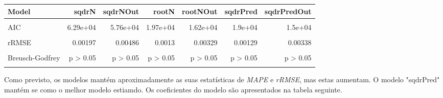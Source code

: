 \documentclass[justified, 11pt]{scrartcl}\usepackage[]{graphicx}\usepackage[]{xcolor}
\newenvironment{knitrout}{}{} %
\begin{document}
\begin{knitrout}
\begin{table}
\begin{tabular}{l|r|r|r|r|r|r}
\hline
Model & sqdrN & sqdrNOut & rootN & rootNOut & sqdrPred & sqdrPredOut\\
\hline
\cellcolor{gray!6}{R2} & \cellcolor{gray!6}{0.887} & \cellcolor{gray!6}{0.74} & \cellcolor{gray!6}{0.369} & \cellcolor{gray!6}{0.383} & \cellcolor{gray!6}{0.443} & \cellcolor{gray!6}{0.496}\\
\hline
AIC & 6.29e+04 & 5.76e+04 & 1.97e+04 & 1.62e+04 & 1.9e+04 & 1.5e+04\\
\hline
\cellcolor{gray!6}{MAPE} & \cellcolor{gray!6}{0.153} & \cellcolor{gray!6}{0.132} & \cellcolor{gray!6}{0.0859} & \cellcolor{gray!6}{0.0832} & \cellcolor{gray!6}{0.084} & \cellcolor{gray!6}{0.0863}\\
\hline
rRMSE & 0.00197 & 0.00486 & 0.0013 & 0.00329 & 0.00129 & 0.00338\\
\hline
\cellcolor{gray!6}{Breusch-Pagan} & \cellcolor{gray!6}{p > 0.05} & \cellcolor{gray!6}{p > 0.05} & \cellcolor{gray!6}{p > 0.05} & \cellcolor{gray!6}{p > 0.05} & \cellcolor{gray!6}{p > 0.05} & \cellcolor{gray!6}{p > 0.05}\\
\hline
Breusch-Godfrey & p > 0.05 & p > 0.05 & p > 0.05 & p > 0.05 & p > 0.05 & p > 0.05\\
\hline
\cellcolor{gray!6}{Jarque-Bera} & \cellcolor{gray!6}{p < 0.05} & \cellcolor{gray!6}{p < 0.05} & \cellcolor{gray!6}{p < 0.05} & \cellcolor{gray!6}{p < 0.05} & \cellcolor{gray!6}{p < 0.05} & \cellcolor{gray!6}{p < 0.05}\\
\hline
\end{tabular}
\endgroup{}
\end{table}

\end{knitrout}
Como previsto, os modelos mantém aproximadamente as suas estatísticas de \textit{MAPE} e \textit{rRMSE}, mas estas aumentam. O modelo "sqdrPred" mantém se como o melhor modelo estiamdo.
Os coeficientes do modelo são apresentados na tabela seguinte.\\
\footnotesize
\end{document}
